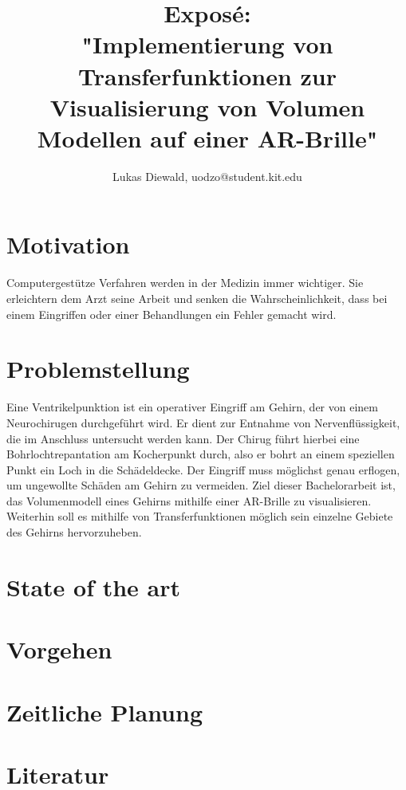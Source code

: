 \documentclass{article}
\title{
Exposé:\\
 \textbf{"Implementierung von Transferfunktionen zur Visualisierung von Volumen Modellen auf einer AR-Brille"}
}
\author{Lukas Diewald, uodzo@student.kit.edu}
\begin{document}
\maketitle

\clearpage
\section{Motivation}
Computergestütze Verfahren werden in der Medizin immer wichtiger. Sie erleichtern dem Arzt seine Arbeit und senken die Wahrscheinlichkeit, dass bei einem Eingriffen oder einer Behandlungen ein Fehler gemacht wird.

\section{Problemstellung}
Eine Ventrikelpunktion ist ein operativer Eingriff am Gehirn, der von einem Neurochirugen durchgeführt wird. Er dient zur Entnahme von Nervenflüssigkeit, die im Anschluss untersucht werden kann. Der Chirug führt hierbei eine Bohrlochtrepantation am Kocherpunkt durch, also er bohrt an einem speziellen Punkt ein Loch in die Schädeldecke. Der Eingriff muss möglichst genau erflogen, um ungewollte Schäden am Gehirn zu vermeiden.
\newline
Ziel dieser Bachelorarbeit ist, das Volumenmodell eines Gehirns mithilfe einer AR-Brille zu visualisieren. Weiterhin soll es mithilfe von Transferfunktionen möglich sein einzelne Gebiete des Gehirns hervorzuheben.

\section{State of the art}

\section{Vorgehen}

\section{Zeitliche Planung}

\section{Literatur}
\end{document}
